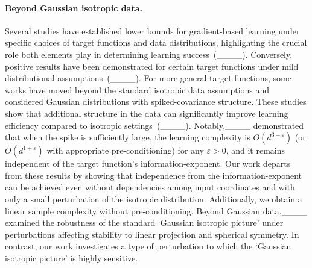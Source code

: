 









\paragraph{Beyond Gaussian isotropic data.}
Several studies have established lower bounds for gradient-based learning under specific choices of target functions and data distributions, highlighting the crucial role both elements play in determining learning success~(____). Conversely, positive results have been demonstrated for certain target functions under mild distributional assumptions~(____).
For more general target functions, some works have moved beyond the standard isotropic data assumptions and considered Gaussian distributions with spiked-covariance structure. These studies show that additional structure in the data can significantly improve learning efficiency compared to isotropic settings~(____). Notably,____ demonstrated that when the spike is sufficiently large, the learning complexity is $O(d^{3+\varepsilon})$ (or $O(d^{1+\varepsilon})$ with appropriate pre-conditioning) for any $\varepsilon > 0$, and it remains independent of the target function's information-exponent.
Our work departs from these results by showing that independence from the information-exponent can be achieved even without dependencies among input coordinates and with only a small perturbation of the isotropic distribution. Additionally, we obtain a linear sample complexity without pre-conditioning.
Beyond Gaussian data,____ examined the robustness of the standard `Gaussian isotropic picture' under perturbations affecting stability to linear projection and spherical symmetry. In contrast, our work investigates a type of perturbation to which the `Gaussian isotropic picture' is highly sensitive.



